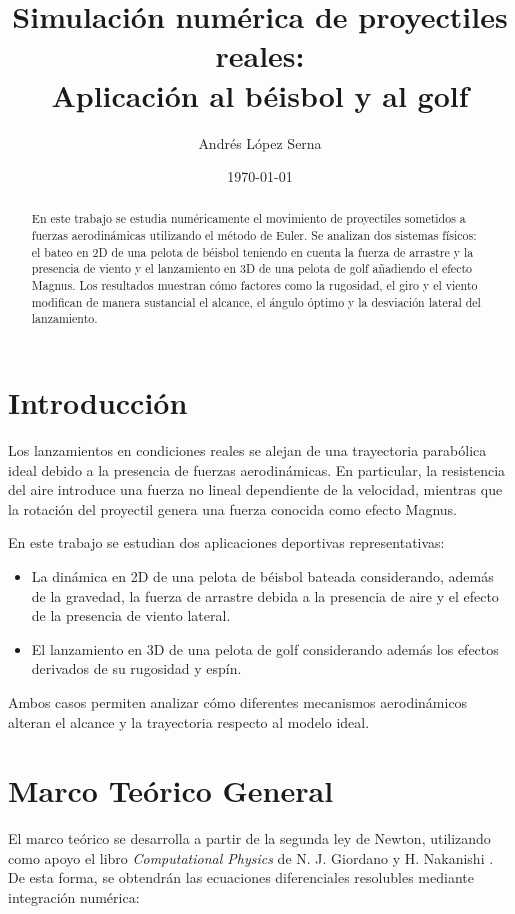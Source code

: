 \documentclass[11pt,a4paper]{article}
\title{Simulación numérica de proyectiles reales:\\
Aplicación al béisbol y al golf}
\author{Andrés López Serna}
\date{\today}
\begin{document}
\maketitle

\begin{abstract}
En este trabajo se estudia numéricamente el movimiento de proyectiles sometidos a fuerzas aerodinámicas utilizando el método de Euler. Se analizan dos sistemas físicos: el bateo en 2D de una pelota de béisbol teniendo en cuenta la fuerza de arrastre y la presencia de viento y el lanzamiento en 3D de una pelota de golf añadiendo el efecto Magnus. Los resultados muestran cómo factores como la rugosidad, el giro y el viento modifican de manera sustancial el alcance, el ángulo óptimo y la desviación lateral del lanzamiento.
\end{abstract}

\section{Introducción}

Los lanzamientos en condiciones reales se alejan de una trayectoria parabólica ideal debido a la presencia de fuerzas aerodinámicas. En particular, la resistencia del aire introduce una fuerza no lineal dependiente de la velocidad, mientras que la rotación del proyectil genera una fuerza conocida como efecto Magnus.

En este trabajo se estudian dos aplicaciones deportivas representativas:

\begin{itemize}
\item La dinámica en 2D de una pelota de béisbol bateada considerando, además de la gravedad, la fuerza de arrastre debida a la presencia de aire y el efecto de la presencia de viento lateral.
\item El lanzamiento en 3D de una pelota de golf considerando además los efectos derivados de su rugosidad y espín.
\end{itemize}

Ambos casos permiten analizar cómo diferentes mecanismos aerodinámicos alteran el alcance y la trayectoria respecto al modelo ideal.

\section{Marco Teórico General}
El marco teórico se desarrolla a partir de la segunda ley de Newton, utilizando como apoyo el libro \textit{Computational Physics} de  N. J. Giordano y H. Nakanishi \cite{giordano}. De esta forma, se obtendrán las ecuaciones diferenciales resolubles mediante integración numérica:
\end{document}
